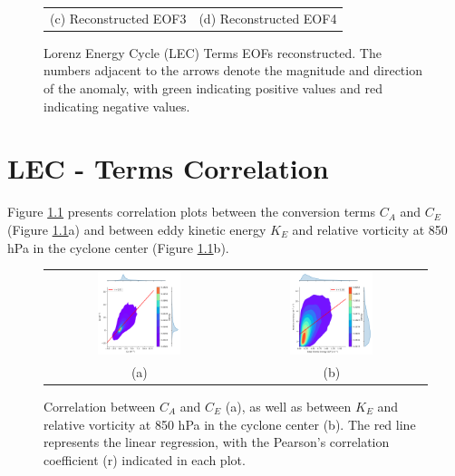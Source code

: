\begin{figure}[!htbp]
\begin{tabular}{cc}
(c) Reconstructed EOF3 & (d) Reconstructed EOF4 \\
\end{tabular}
\caption[Reconstructed EOFs]{Lorenz Energy Cycle (LEC) Terms EOFs reconstructed. The numbers adjacent to the arrows denote the magnitude and direction of the anomaly, with green indicating positive values and red indicating negative values.}
\label{fig:ap_eofs}
\end{figure}

\chapter{LEC - Terms Correlation}\label{ap04}

Figure \ref{fig:ap04} presents correlation plots between the conversion terms $C_A$ and $C_E$ (Figure \ref{fig:ap04}a) and between eddy kinetic energy $K_E$ and relative vorticity at 850 hPa in the cyclone center (Figure \ref{fig:ap04}b).

\begin{figure}[!htbp]
\centering
\begin{tabular}{cc}
\includegraphics[width=0.46\textwidth]{figs_appendix/correlation_ca_ce.png} & 
\includegraphics[width=0.46\textwidth]{figs_appendix/correlation_ke_vor42.png} \\
(a) & (b) \\
\end{tabular}
\caption[Correlation Between LEC Terms]{Correlation between $C_A$ and $C_E$ (a), as well as between $K_E$ and relative vorticity at 850 hPa in the cyclone center (b). The red line represents the linear regression, with the Pearson's correlation coefficient (r) indicated in each plot.}
\label{fig:ap04}
\end{figure}

